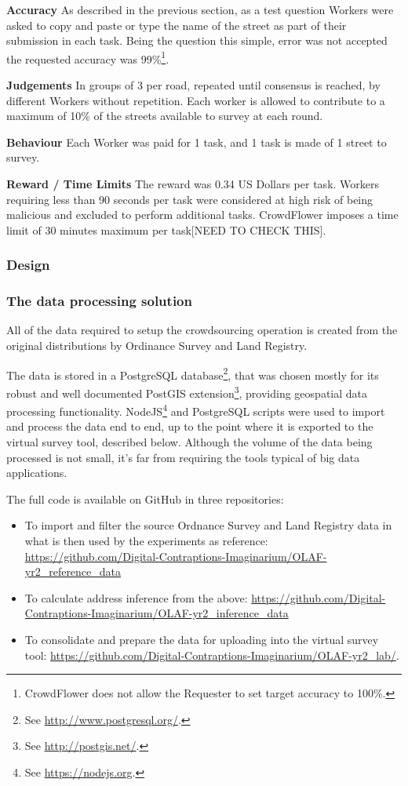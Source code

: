 \textbf{Accuracy} As described in the previous section, as a test question Workers were asked to copy and paste or type the name of the street as part of their submission in each task. Being the question this simple, error was not accepted the requested accuracy was 99\%\footnote{CrowdFlower does not allow the Requester to set target accuracy to 100\%.}.

\textbf{Judgements} In groups of 3 per road, repeated until consensus is reached, by different Workers without repetition. Each worker is allowed to contribute to a maximum of 10\% of the streets available to survey at each round.

\textbf{Behaviour} Each Worker was paid for 1 task, and 1 task is made of 1 street to survey.

\textbf{Reward / Time Limits} The reward was 0.34 US Dollars per task. Workers requiring less than 90 seconds per task were considered at high risk of being malicious and excluded to perform additional tasks. CrowdFlower imposes a time limit of 30 minutes maximum per task[NEED TO CHECK THIS].

\subsubsection{Design}
\subsubsection{The data processing solution}

All of the data required to setup the crowdsourcing operation is created from the original distributions by Ordinance Survey and Land Registry. 

The data is stored in a PostgreSQL database\footnote{See \url{http://www.postgresql.org/}.}, that was chosen mostly for its robust and well documented PostGIS extension\footnote{See \url{http://postgis.net/}.}, providing geospatial data processing functionality. NodeJS\footnote{See \url{https://nodejs.org}.} and PostgreSQL scripts were used to import and process the data end to end, up to the point where it is exported to the virtual survey tool, described below. Although the volume of the data being processed is not small, it's far from requiring the tools typical of big data applications. 

The full code is available on GitHub in three repositories:

\begin{itemize}
    \item To import and filter the source Ordnance Survey and Land Registry data in what is then used by the experiments as reference: \url{https://github.com/Digital-Contraptions-Imaginarium/OLAF-yr2_reference_data}
    \item To calculate address inference from the above: \url{https://github.com/Digital-Contraptions-Imaginarium/OLAF-yr2_inference_data}
    \item To consolidate and prepare the data for uploading into the virtual survey tool: \url{https://github.com/Digital-Contraptions-Imaginarium/OLAF-yr2_lab/}.
\end{itemize}

